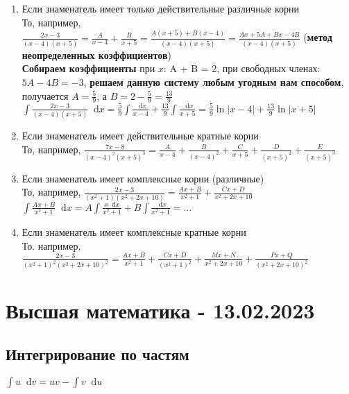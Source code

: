 \documentclass{article}
\newcommand*\diff{\mathop{}\!\mathrm{d}}
\begin{document}
\begin{enumerate}
    \item Если знаменатель имеет только действительные различные корни \\
    То, например, $\frac{2 x - 3}{(x - 4)(x + 5)} = \frac{A}{x - 4} + \frac{B}{x + 5} = \frac{A(x + 5) + B(x - 4)}{(x - 4)(x + 5)} = \frac{A x + 5 A + B x - 4 B}{(x - 4)(x + 5)}$ (\textbf{метод неопределенных коэффициентов}) \\
    \textbf{Собираем коэффициенты} при $x$: A + B = 2, при свободных членах: $5 A - 4 B = -3$, \textbf{решаем данную систему любым угодным нам способом}, получается $A = \frac{5}{9}$, а $B = 2 - \frac{5}{9} = \frac{13}{9}$ \\
    $\int \frac{2 x - 3}{(x - 4)(x + 5)} \diff x = \frac{5}{9} \int \frac{\diff x}{x - 4} + \frac{13}{9} \int \frac{\diff x}{x + 5}= \frac{5}{9} \ln |x - 4| + \frac{13}{9} \ln |x + 5|$
    \item Если знаменатель имеет действительные кратные корни \\
    То, например, $\frac{7 x - 8}{(x - 4)^{2} (x+5)^{3}} = \frac{A}{x - 4} + \frac{B}{(x - 4)^2} + \frac{C}{x + 5} + \frac{D}{(x + 5)^2} + \frac{E}{(x + 5)^3}$
    \item Если знаменатель имеет комплексные корни (различные) \\
    То, например, $\frac{2 x - 3}{(x^2 + 1) (x^2 + 2 x + 10)} = \frac{A x + B}{x^2 + 1} + \frac{C x + D}{x^2 + 2x + 10}$ \\
    $\int \frac{A x + B}{x^2 + 1} \diff x = A \int \frac{x \diff x}{x^2 + 1} + B \int \frac{\diff x}{x^2 + 1} = \dots$
    \item Если знаменатель имеет комплексные кратные корни \\
    То. например, $\frac{2 x - 3}{(x^2 + 1)^2 (x^2 + 2x + 10)^2} = \frac{A x + B}{x^2 + 1} + \frac{C x + D}{(x^2 + 1)^2} + \frac{M x + N}{x^2 + 2x + 10} + \frac{P x + Q}{(x^2 + 2x + 10)^2}$
\end{enumerate}

\pagebreak
\section{Высшая математика - 13.02.2023}

\subsection{Интегрирование по частям}

$\int u \diff v = u v - \int v \diff u$
\end{document}
